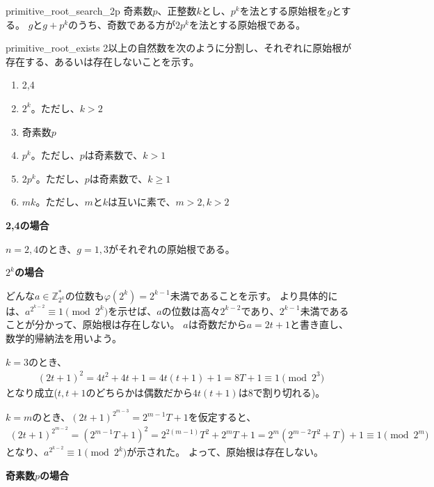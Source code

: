 \begin{Prop}{}{primitive_root_search_2p}
奇素数$p$、正整数$k$とし、$p^k$を法とする原始根を$g$とする。
$g$と$g+p^k$のうち、奇数である方が$2p^k$を法とする原始根である。
\end{Prop}

\begin{prProof}{primitive_root_exists}
2以上の自然数を次のように分割し、それぞれに原始根が存在する、あるいは存在しないことを示す。
\begin{enumerate}
 \item 2,4
 \item $2^k$。ただし、$k>2$
 \item 奇素数$p$
 \item $p^k$。ただし、$p$は奇素数で、$k>1$
 \item $2p^k$。ただし、$p$は奇素数で、$k\ge1$
 \item $mk$。ただし、$m$と$k$は互いに素で、$m>2, k>2$
\end{enumerate}

\noindent\textbf{2,4の場合}

$n=2,4$のとき、$g=1,3$がそれぞれの原始根である。

\noindent\textbf{$2^k$の場合}

どんな$a\in\mathbb{Z}_{2^k}^*$の位数も$\varphi(2^k)=2^{k-1}$未満であることを示す。
より具体的には、$a^{2^{k-2}}\equiv1\pmod{2^k}$を示せば、$a$の位数は高々$2^{k-2}$であり、$2^{k-1}$未満であることが分かって、原始根は存在しない。
$a$は奇数だから$a=2t+1$と書き直し、数学的帰納法を用いよう。

$k=3$のとき、
\begin{align*}
(2t + 1)^2 = 4t^2 + 4t + 1 = 4t(t+1) + 1 = 8T + 1 \equiv 1 \pmod{2^3}
\end{align*}
となり成立($t, t+1$のどちらかは偶数だから$4t(t+1)$は8で割り切れる)。

$k=m$のとき、$(2t+1)^{2^{m-3}}=2^{m-1}T+1$を仮定すると、
\begin{align*}
(2t + 1)^{2^{m-2}} = (2^{m-1}T+1)^2 = 2^{2(m-1)}T^2 + 2^mT + 1 = 2^m(2^{m-2}T^2 + T) + 1 \equiv 1 \pmod{2^m}
\end{align*}
となり、$a^{2^{k-2}}\equiv1\pmod{2^k}$が示された。
よって、原始根は存在しない。

\noindent\textbf{奇素数$p$の場合}


\end{prProof}
